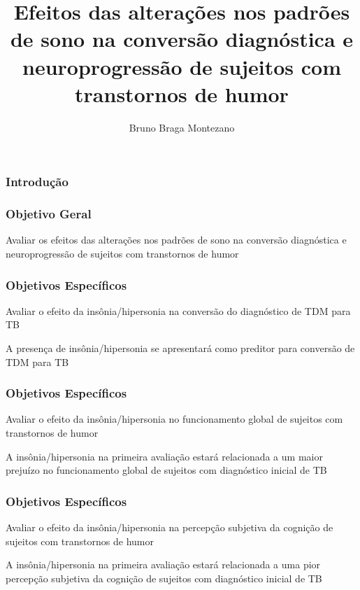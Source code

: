 \documentclass{beamer}
\title{Efeitos das alterações nos padrões de sono na conversão diagnóstica e
       neuroprogressão de sujeitos com transtornos de humor}
\author[Bruno Montezano]{Bruno Braga Montezano}
\institute{Universidade Católica de Pelotas}
\begin{document}
\begin{frame}

\maketitle

\end{frame}

\begin{frame}
\frametitle{Introdução}



\end{frame}

\begin{frame}
    \frametitle{Objetivo Geral}

    \centering
    \Large
    Avaliar os efeitos das alterações nos padrões de sono na conversão
    diagnóstica e neuroprogressão de sujeitos com transtornos de humor

    \end{frame}

\begin{frame}
    \frametitle{Objetivos Específicos}

    \Large
    \begin{block}{Avaliar o efeito da insônia/hipersonia na conversão do
                  diagnóstico de TDM para TB}

        A presença de insônia/hipersonia se apresentará como preditor para
        conversão de TDM para TB
                  
    \end{block}
    
\end{frame}

\begin{frame}
\frametitle{Objetivos Específicos}

    \Large
    \begin{block}{Avaliar o efeito da insônia/hipersonia no funcionamento
                  global de sujeitos com transtornos de humor}

        A insônia/hipersonia na primeira avaliação estará relacionada a um
        maior prejuízo no funcionamento global de sujeitos com diagnóstico
        inicial de TB
                  
    \end{block}
    
\end{frame}

\begin{frame}
\frametitle{Objetivos Específicos}

    \Large
    \begin{block}{Avaliar o efeito da insônia/hipersonia na percepção subjetiva
                  da cognição de sujeitos com transtornos de humor}

        A insônia/hipersonia na primeira avaliação estará relacionada a uma pior
        percepção subjetiva da cognição de sujeitos com diagnóstico inicial de TB
                  
    \end{block}
    
\end{frame}
\end{document}
